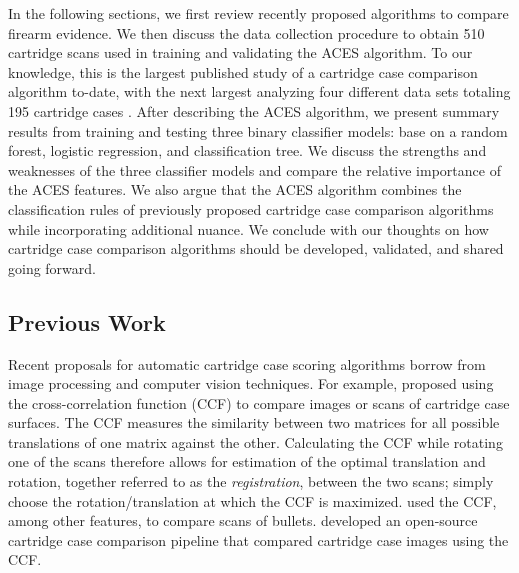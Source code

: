\documentclass[11pt,]{isuthesis}
\begin{document}
In the following sections, we first review recently proposed algorithms to compare firearm evidence.
We then discuss the data collection procedure to obtain 510 cartridge scans used in training and validating the ACES algorithm.
To our knowledge, this is the largest published study of a cartridge case comparison algorithm to-date, with the next largest analyzing four different data sets totaling 195 cartridge cases \citep{chen_convergence_2017}.
After describing the ACES algorithm, we present summary results from training and testing three binary classifier models: base on a random forest, logistic regression, and classification tree.
We discuss the strengths and weaknesses of the three classifier models and compare the relative importance of the ACES features.
We also argue that the ACES algorithm combines the classification rules of previously proposed cartridge case comparison algorithms while incorporating additional nuance.
We conclude with our thoughts on how cartridge case comparison algorithms should be developed, validated, and shared going forward.

\hypertarget{previous-work}{%
\subsection{Previous Work}\label{previous-work}}

Recent proposals for automatic cartridge case scoring algorithms borrow from image processing and computer vision techniques.
For example, \citet{vorburger_surface_2007} proposed using the cross-correlation function (CCF) to compare images or scans of cartridge case surfaces.
The CCF measures the similarity between two matrices for all possible translations of one matrix against the other.
Calculating the CCF while rotating one of the scans therefore allows for estimation of the optimal translation and rotation, together referred to as the \emph{registration}, between the two scans; simply choose the rotation/translation at which the CCF is maximized.
\citet{hare_automatic_2016} used the CCF, among other features, to compare scans of bullets.
\citet{tai_fully_2018} developed an open-source cartridge case comparison pipeline that compared cartridge case images using the CCF.
\end{document}
